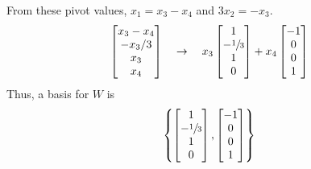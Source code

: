 \documentclass[11pt]{article}
\begin{document}
\begin{homeworkProblem}
    From these pivot values, $x_1 = x_3 - x_4$ and $3x_2 = -x_3$.
    \[
        \begin{bmatrix}
            x_3 - x_4 \\
            -x_3/3    \\
            x_3       \\
            x_4
        \end{bmatrix} \quad\to\quad
        x_3
        \begin{bmatrix}
            1             \\
            -\sfrac{1}{3} \\
            1             \\
            0             \\
        \end{bmatrix} +
        x_4
        \begin{bmatrix}
            -1 \\
            0  \\
            0  \\
            1  \\
        \end{bmatrix}
    \]
    Thus, a basis for $W$ is
    \[
        \left\{
        \begin{bmatrix}
            1             \\
            -\sfrac{1}{3} \\
            1             \\
            0             \\
        \end{bmatrix},
        \begin{bmatrix}
            -1 \\
            0  \\
            0  \\
            1  \\
        \end{bmatrix}
        \right\}
    \]

\end{homeworkProblem}

\pagebreak
\end{document}
